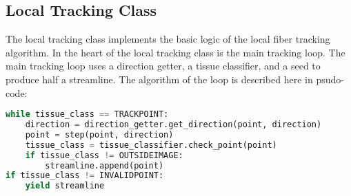 \subsection{Local Tracking Class}
    The local tracking class implements the basic logic of the local fiber tracking algorithm. In the heart of the local tracking class is the main tracking loop. The main tracking loop uses a direction getter, a tissue classifier, and a seed to produce half a streamline. The algorithm of the loop is described here in psudo-code:
\begin{lstlisting}[language=python]
while tissue_class == TRACKPOINT:
    direction = direction_getter.get_direction(point, direction)
    point = step(point, direction)
    tissue_class = tissue_classifier.check_point(point)
    if tissue_class != OUTSIDEIMAGE:
        streamline.append(point)
if tissue_class != INVALIDPOINT:
    yield streamline
\end{lstlisting}